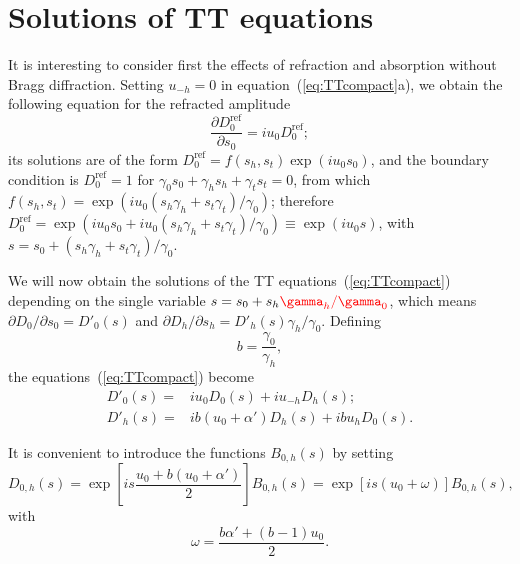 \documentclass[preprint]{iucr}              %
\newcommand{\inred}[1]{{\color{red}#1}}
\begin{document}
\section{Solutions of TT equations}
\label{sec:TTsolutions}

%

It is interesting to consider first the effects of refraction and absorption without Bragg diffraction. 
Setting $u_{-h}=0$ in equation~(\ref{eq:TTcompact}a), we obtain the following equation for the refracted amplitude 
\begin{equation}
\frac{\partial D_0^{\text{ref}}}{\partial s_0} = i u_0 D_0^{\text{ref}};
\end{equation}
its solutions are of the form $D_0^{\text{ref}}=f(s_h,s_t) \exp(i u_0 s_0)$, and the boundary condition is $D_0^{\text{ref}}=1$ for  $\gamma_0 s_0 + \gamma_h s_h + \gamma_t s_t=0$, from which $f(s_h,s_t)=\exp(i u_0 (s_h \gamma_h + s_t \gamma_t)/\gamma_0)$; therefore $D_0^{\text{ref}}= \exp(i u_0 s_0 + i u_0(s_h \gamma_h + s_t \gamma_t)/\gamma_0) \equiv \exp(i u_0 s)$, with $s=s_0+(s_h \gamma_h+s_t \gamma_t)/\gamma_0$.

We will now obtain the solutions of the TT equations~(\ref{eq:TTcompact}) depending on the single variable $s=s_0+s_h\inred{\gamma_h/\gamma_0}$, which means 
$\partial D_{0} / \partial  s_{0}=D'_{0}(s)$ and $\partial D_{h} / \partial s_{h}=D'_{h}(s)\gamma_h/\gamma_0$.
Defining 
\begin{equation}\label{eq:b}
b = \frac{\gamma_0}{\gamma_h},    
\end{equation}
the equations~(\ref{eq:TTcompact}) become
\begin{subequations}
\label{eq:TTlaue}
\begin{align}
D'_0(s) =& i u_0 D_0(s) + i u_{-h} D_h(s); \\
D'_h(s) =& i b (u_0 + \alpha') D_h(s) + i b u_{h} D_0(s).
\end{align}
\end{subequations}

It is convenient to introduce the functions $B_{0,h}(s)$ by setting
\begin{equation}
\label{eq:Bdefinition}
D_{0,h}(s) = \exp \left[ i s \frac{u_0 + b (u_0+\alpha')}{2} \right] B_{0,h}(s) = \exp[i s (u_0+\omega)] B_{0,h}(s),  
\end{equation}
with
\begin{equation}\label{eq:omega}
    \omega=\frac{ b \alpha' + (b-1) u_0}{2}.
\end{equation} 
\end{document}
